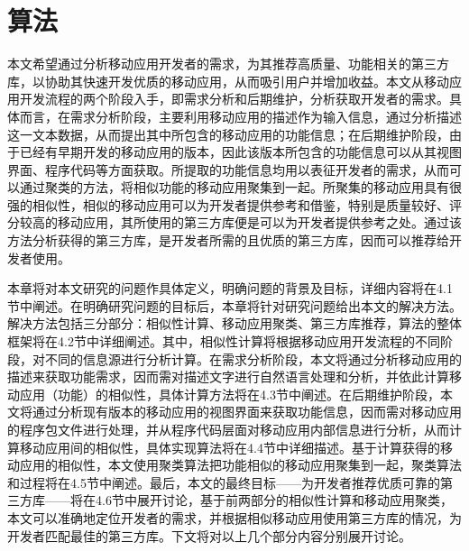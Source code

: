 \chapter{算法}
本文希望通过分析移动应用开发者的需求，为其推荐高质量、功能相关的第三方库，以协助其快速开发优质的移动应用，从而吸引用户并增加收益。本文从移动应用开发流程的两个阶段入手，即需求分析和后期维护，分析获取开发者的需求。具体而言，在需求分析阶段，主要利用移动应用的描述作为输入信息，通过分析描述这一文本数据，从而提出其中所包含的移动应用的功能信息；在后期维护阶段，由于已经有早期开发的移动应用的版本，因此该版本所包含的功能信息可以从其视图界面、程序代码等方面获取。所提取的功能信息均用以表征开发者的需求，从而可以通过聚类的方法，将相似功能的移动应用聚集到一起。所聚集的移动应用具有很强的相似性，相似的移动应用可以为开发者提供参考和借鉴，特别是质量较好、评分较高的移动应用，其所使用的第三方库便是可以为开发者提供参考之处。通过该方法分析获得的第三方库，是开发者所需的且优质的第三方库，因而可以推荐给开发者使用。

本章将对本文研究的问题作具体定义，明确问题的背景及目标，详细内容将在4.1节中阐述。在明确研究问题的目标后，本章将针对研究问题给出本文的解决方法。解决方法包括三分部分：相似性计算、移动应用聚类、第三方库推荐，算法的整体框架将在4.2节中详细阐述。其中，相似性计算将根据移动应用开发流程的不同阶段，对不同的信息源进行分析计算。在需求分析阶段，本文将通过分析移动应用的描述来获取功能需求，因而需对描述文字进行自然语言处理和分析，并依此计算移动应用（功能）的相似性，具体计算方法将在4.3节中阐述。在后期维护阶段，本文将通过分析现有版本的移动应用的视图界面来获取功能信息，因而需对移动应用的程序包文件进行处理，并从程序代码层面对移动应用内部信息进行分析，从而计算移动应用间的相似性，具体实现算法将在4.4节中详细描述。基于计算获得的移动应用的相似性，本文使用聚类算法把功能相似的移动应用聚集到一起，聚类算法和过程将在4.5节中阐述。最后，本文的最终目标——为开发者推荐优质可靠的第三方库——将在4.6节中展开讨论，基于前两部分的相似性计算和移动应用聚类，本文可以准确地定位开发者的需求，并根据相似移动应用使用第三方库的情况，为开发者匹配最佳的第三方库。下文将对以上几个部分内容分别展开讨论。



